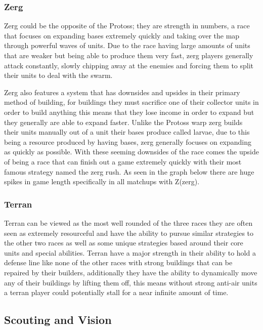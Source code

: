 \documentclass[a4paper,12pt]{report}
\begin{document}
\subsubsection{Zerg}

Zerg could be the opposite of the Protoss; they are strength in numbers, a race that focuses on expanding bases extremely quickly and taking over the map through powerful waves of units. Due to the race having large amounts of units that are weaker but being able to produce them very fast, zerg players generally attack constantly, slowly chipping away at the enemies and forcing them to split their units to deal with the swarm.

Zerg also features a system that has downsides and upsides in their primary method of building, for buildings they must sacrifice one of their collector units in order to build anything this means that they lose income in order to expand but they generally are able to expand faster. Unlike the Protoss warp  zerg builds their units manually out of a unit their bases produce called larvae, due to this being a resource produced by having bases, zerg generally focuses on expanding as quickly as possible. With these seeming downsides of the race comes the upside of being a race that can finish out a game extremely quickly with their most famous strategy named the zerg rush. As seen in the graph below there are huge spikes in game length specifically in all matchups with Z(zerg).

\subsubsection{Terran}

Terran can be viewed as the most well rounded of the three races they are often seen as extremely resourceful and have the ability to pursue similar strategies to the other two races as well as some unique strategies based around their core units and special abilities. Terran have a major strength in their ability to hold a defense line like none of the other races with strong buildings that can be repaired by their builders, additionally they have the ability to dynamically move any of their buildings by lifting them off, this means without strong anti-air units a terran player could potentially stall for a near infinite amount of time.

\subsection{Scouting and Vision}
\end{document}
